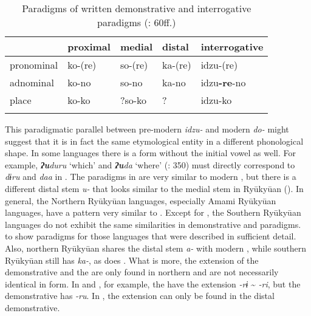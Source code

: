 \begin{table}
\caption{Paradigms of written  demonstrative and interrogative paradigms (\citealt{Aston1904}: 60ff.)}
\label{tab:japa:10}

\begin{tabularx}{\textwidth}{XXXXl}
\lsptoprule
& \textbf{proximal} & \textbf{medial} & \textbf{distal} & \textbf{interrogative}\\
\midrule
pronominal & ko-(re) & so-(re) & ka-(re) & idzu-(re)\\
adnominal & ko-no & so-no & ka-no & idzu\textbf{-re}-no\\
place & ko-ko & ?so-ko & ? & idzu-ko\\
\lspbottomrule
\end{tabularx}
\end{table}

This paradigmatic parallel between pre-modern \textit{idzu-} and modern \textit{do-} might suggest that it is in fact the same etymological entity in a different phonological shape. In some   languages there is a form without the initial vowel as well. For example,  \textbf{\textit{ʔu}}\textit{duru} ‘which’ and \textbf{\textit{ʔu}}\textit{da} ‘where’ (\citealt{vanderLubbeTokunaga2015}: 350) must directly correspond to \textit{dɨru} and \textit{daa} in . The paradigms in  are very similar to modern , but there is a different distal stem \textit{u-} that looks similar to the medial stem in Ryūkyūan (). In general, the Northern Ryūkyūan languages, especially Amami Ryūkyūan languages, have a pattern very similar to . Except for , the Southern Ryūkyūan languages do not exhibit the same similarities in demonstrative and  paradigms.  to  show paradigms for those languages that were described in sufficient detail. Also, northern Ryūkyūan shares the distal stem \textit{a-} with modern , while southern Ryūkyūan still has \textit{ka-}, as does . What is more, the extension of the demonstrative and the  are only found in northern   and are not necessarily identical in form. In  and , for example, the  have the extension \textit{-rɨ} {\textasciitilde} \textit{-ri}, but the demonstrative has \textit{-ru}. In , the extension can only be found in the distal demonstrative.

